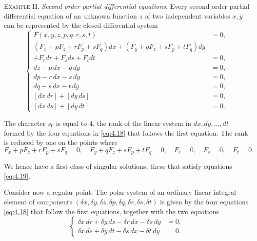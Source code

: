 \documentclass[leqno,11pt]{book}
\numberwithin{equation}{chapter}
\theoremstyle{shape1}
\theoremstyle{shape0}
\theoremstyle{shape2}
\theoremstyle{definition}
\begin{document}
\vspace{12pt}\fsec \textsc{Example II.} \emph{Second order partial differential equations}. Every second order partial differential equation of an unknown function $z$ of two independent variables $x,y$ can be represented by the closed differential system
\begin{equation}
  \label{eq:4.18}
  \left\{
    \begin{aligned}
      F(x,y,z,p,q,r,s,t)&=0,\\
      (F_{x}+pF_{z}+rF_{p}+sF_{q})dx+
      (F_{y}+qF_{z}+sF_{p}+tF_{q})dy\\
      +F_{r}dr+F_{s}ds+F_{t}dt&=0,\\
      dz-p\,dx-q\,dy&=0,\\
      dp-r\,dx-s\,dy&=0,\\
      dq-s\,dx-t\,dy&=0,\\
      [dx\,dr]+[dy\,ds]&=0,\\
      [dx\,ds]+[dy\,dt]&=0.
    \end{aligned}
  \right.
\end{equation}

The character $s_{0}$ is equal to $4$, the rank of the linear system in $dx,dy,\dots,dt$ formed by the four equations in \eqref{eq:4.18} that follows the first equation. The rank is reduced by one on the points where
\begin{equation}
  \label{eq:4.19}
  F_{x}+pF_{z}+rF_{p}+sF_{q}=0,\quad F_{y}+qF_{z}+sF_{p}+tF_{q}=0,\quad F_{r}=0,\quad F_{s}=0,\quad F_{t}=0.
\end{equation}

We hence have a first class of singular solutions, these that satisfy equations \eqref{eq:4.19}.

Consider now a regular point. The polar system of an ordinary linear integral element of components $(\delta x,\delta y, \delta z, \delta p, \delta q, \delta r, \delta s, \delta t)$ is given by the four equations \eqref{eq:4.18} that follow the first equations, together with the two equations
\begin{equation}
  \label{eq:4.20}
  \left\{
    \begin{aligned}
    \delta x\,dr+\delta y\,ds-\delta r\,dx-\delta s\,dy&=0,\\
    \delta x\,ds+\delta y\,dt-\delta s\,dx-\delta t\,dy&=0.      
    \end{aligned}
  \right.
\end{equation}
\end{document}
